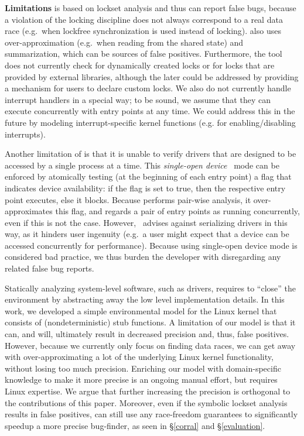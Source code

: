 \medskip\noindent\textbf{Limitations }
%
%
\whoop is based on lockset analysis and thus can report false bugs, because a violation of the locking discipline does not always correspond to a real data race (e.g.\ when lockfree synchronization is used instead of locking). \whoop also uses over-approximation (e.g.\ when reading from the shared state) and summarization, which can be sources of false positives. Furthermore, the tool does not currently check for dynamically created locks or for locks that are provided by external libraries, although the later could be addressed by providing a mechanism for users to declare custom locks. We also do not currently handle interrupt handlers in a special way; to be sound, we assume that they can execute concurrently with entry points at any time. We could address this in the future by modeling interrupt-specific kernel functions (e.g. for enabling/disabling interrupts).

Another limitation of \whoop is that it is unable to verify drivers that are designed to be accessed by a single process at a time. This \emph{single-open device}~\cite{corbet2005linux} mode can be enforced by atomically testing (at the beginning of each entry point) a flag that indicates device availability: if the flag is set to true, then the respective entry point executes, else it blocks. Because \whoop performs pair-wise analysis, it over-approximates this flag, and regards a pair of entry points as running concurrently, even if this is not the case. However,~\cite{corbet2005linux} advises against serializing drivers in this way, as it hinders user ingenuity (e.g.\ a user might expect that a device can be accessed concurrently for performance). Because using single-open device mode is considered bad practice, we thus burden the developer with disregarding any related false bug reports.

Statically analyzing system-level software, such as drivers, requires to ``close'' the environment by abstracting away the low level implementation details. In this work, we developed a simple environmental model for the Linux kernel that consists of (nondeterministic) stub functions. A limitation of our model is that it can, and will, ultimately result in decreased precision and, thus, false positives. However, because we currently only focus on finding data races, we can get away with over-approximating a lot of the underlying Linux kernel functionality, without losing too much precision. Enriching our model with domain-specific knowledge to make it more precise is an ongoing manual effort, but requires Linux expertise. We argue that further increasing the precision is orthogonal to the contributions of this paper. Moreover, even if the symbolic lockset analysis results in false positives, \whoop can still use any race-freedom guarantees to significantly speedup a more precise bug-finder, as seen in \S\ref{corral} and \S\ref{evaluation}.
